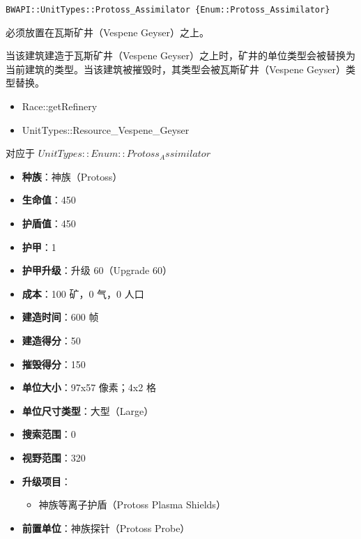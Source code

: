 \begin{tcolorbox}[colback=white, colframe=black!60!white, title=Protoss\_Assimilator(), arc=0mm]
    \begin{verbatim}
BWAPI::UnitTypes::Protoss_Assimilator {Enum::Protoss_Assimilator}
    \end{verbatim}
    必须放置在瓦斯矿井（Vespene Geyser）之上。
    \begin{note}
        当该建筑建造于瓦斯矿井（Vespene Geyser）之上时，矿井的单位类型会被替换为当前建筑的类型。当该建筑被摧毁时，其类型会被瓦斯矿井（Vespene Geyser）类型替换。
    \end{note}
    \begin{refer}
        \begin{itemize}
            \item Race::getRefinery
            \item UnitTypes::Resource\_Vespene\_Geyser
        \end{itemize}
    \end{refer}
    对应于  $ UnitTypes::Enum::Protoss_Assimilator $ 
    \begin{itemize}
        \item \textbf{种族}：神族（Protoss）
        \item \textbf{生命值}：450
        \item \textbf{护盾值}：450
        \item \textbf{护甲}：1
        \item \textbf{护甲升级}：升级 60（Upgrade 60）
        \item \textbf{成本}：100 矿，0 气，0 人口
        \item \textbf{建造时间}：600 帧
        \item \textbf{建造得分}：50
        \item \textbf{摧毁得分}：150
        \item \textbf{单位大小}：97x57 像素；4x2 格
        \item \textbf{单位尺寸类型}：大型（Large）
        \item \textbf{搜索范围}：0
        \item \textbf{视野范围}：320
        \item \textbf{升级项目}：
            \begin{itemize}
                \item 神族等离子护盾（Protoss Plasma Shields）
            \end{itemize}
        \item \textbf{前置单位}：神族探针（Protoss Probe）

\end{itemize}
\end{tcolorbox}
